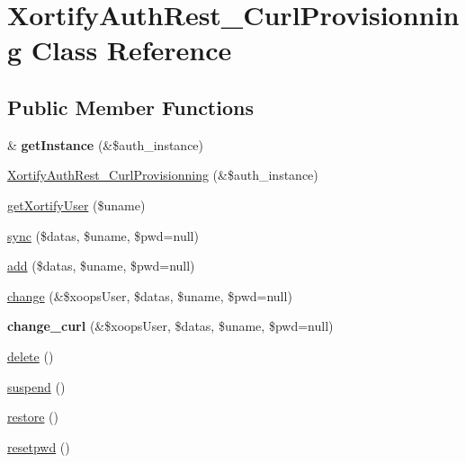 \hypertarget{class_xortify_auth_rest___curl_provisionning}{\section{Xortify\-Auth\-Rest\-\_\-\-Curl\-Provisionning Class Reference}
\label{class_xortify_auth_rest___curl_provisionning}
}
\subsection*{Public Member Functions}
\begin{DoxyCompactItemize}
\item 
\hypertarget{class_xortify_auth_rest___curl_provisionning_ab3d8c4de077af9958326ed5da5f2731c}{\& {\bfseries get\-Instance} (\&\$auth\-\_\-instance)}\label{class_xortify_auth_rest___curl_provisionning_ab3d8c4de077af9958326ed5da5f2731c}

\item 
\hyperlink{class_xortify_auth_rest___curl_provisionning_aca8a1e2414ebc4d9ad3f7ec0d85767e3}{Xortify\-Auth\-Rest\-\_\-\-Curl\-Provisionning} (\&\$auth\-\_\-instance)
\item 
\hyperlink{class_xortify_auth_rest___curl_provisionning_a6c0366a343b465cc56e3c72a35447413}{get\-Xortify\-User} (\$uname)
\item 
\hyperlink{class_xortify_auth_rest___curl_provisionning_a6fc8652d6c6f4cee7dc1a209019f64b9}{sync} (\$datas, \$uname, \$pwd=null)
\item 
\hyperlink{class_xortify_auth_rest___curl_provisionning_a7c11d10868fdf647e8e7f321d1beaf40}{add} (\$datas, \$uname, \$pwd=null)
\item 
\hyperlink{class_xortify_auth_rest___curl_provisionning_a1c2441802da8551c2d8dbf7e344d174d}{change} (\&\$xoops\-User, \$datas, \$uname, \$pwd=null)
\item 
\hypertarget{class_xortify_auth_rest___curl_provisionning_a848e33d41dc85c5d1711e15589c7df75}{{\bfseries change\-\_\-curl} (\&\$xoops\-User, \$datas, \$uname, \$pwd=null)}\label{class_xortify_auth_rest___curl_provisionning_a848e33d41dc85c5d1711e15589c7df75}

\item 
\hyperlink{class_xortify_auth_rest___curl_provisionning_aee6d7accb9a393fecb5b7544383c1ad9}{delete} ()
\item 
\hyperlink{class_xortify_auth_rest___curl_provisionning_ae89ceac4f3f37850c81bf7bad0ec8f65}{suspend} ()
\item 
\hyperlink{class_xortify_auth_rest___curl_provisionning_a767a8b5f43818c9b242acc93d19e6600}{restore} ()
\item 
\hyperlink{class_xortify_auth_rest___curl_provisionning_a2a064ea585111143c9de52f745359f02}{resetpwd} ()
\end{DoxyCompactItemize}
